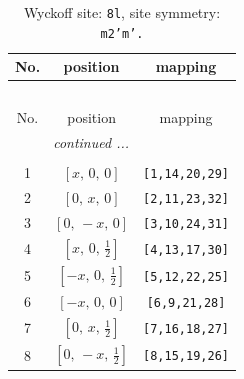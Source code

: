 \documentclass[fleqn,8pt]{jsarticle}
\begin{document}
\begin{longtable}{ccc}
\caption{Wyckoff site: {\tt 8l}, site symmetry: {\tt m2'm'.}}
 \\
 \hline \hline
No. & position & mapping \\ \hline \endfirsthead

\multicolumn{2}{l}{\tablename\ \thetable{}} \\
 \hline \hline
No. & position & mapping \\ \hline \endhead

 \hline \hline
\multicolumn{2}{r}{\footnotesize\it continued ...} \\ \endfoot

 \hline \hline
\multicolumn{2}{r}{} \\ \endlastfoot

1 & $\left[ x,\, 0,\, 0 \right]$ & {\tt [1,14,20,29]} \\ \hline
2 & $\left[ 0,\, x,\, 0 \right]$ & {\tt [2,11,23,32]} \\ \hline
3 & $\left[ 0,\, - x,\, 0 \right]$ & {\tt [3,10,24,31]} \\ \hline
4 & $\left[ x,\, 0,\, \frac{1}{2} \right]$ & {\tt [4,13,17,30]} \\ \hline
5 & $\left[ - x,\, 0,\, \frac{1}{2} \right]$ & {\tt [5,12,22,25]} \\ \hline
6 & $\left[ - x,\, 0,\, 0 \right]$ & {\tt [6,9,21,28]} \\ \hline
7 & $\left[ 0,\, x,\, \frac{1}{2} \right]$ & {\tt [7,16,18,27]} \\ \hline
8 & $\left[ 0,\, - x,\, \frac{1}{2} \right]$ & {\tt [8,15,19,26]} \\
\end{longtable}
\renewcommand{\arraystretch}{1.2}
\end{document}
